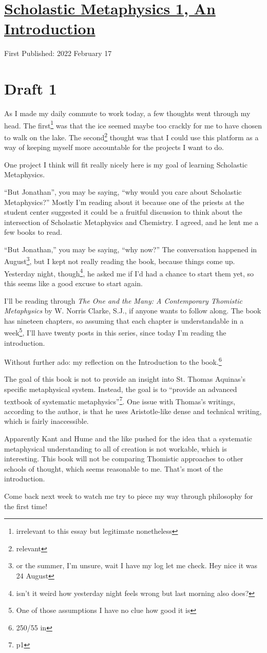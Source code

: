 \documentclass[12pt]{article}[titlepage]
\newcommand{\say}[1]{``#1''}
\newcommand{\1}{\={a}}
\newcommand{\2}{\={e}}
\newcommand{\3}{\={\i}}
\newcommand{\4}{\=o}
\newcommand{\5}{\=u}
\newcommand{\6}{\={A}}
\renewcommand{\,}{\textsuperscript{,}}
\begin{document}
\doublespacing
\section{\href{scholastic-metaphysics-1.html}{Scholastic Metaphysics 1, An Introduction}}
First Published: 2022 February 17

\section{Draft 1}
As I made my daily commute to work today, a few thoughts went through my head.
The first\footnote{irrelevant to this essay but legitimate nonetheless} was that the ice seemed maybe too crackly for me to have chosen to walk on the lake.
The second\footnote{relevant} thought was that I could use this platform as a way of keeping myself more accountable for the projects I want to do.

One project I think will fit really nicely here is my goal of learning Scholastic Metaphysics.

\say{But Jonathan}, you may be saying, \say{why would you care about Scholastic Metaphysics?}
Mostly I'm reading about it because one of the priests at the student center suggested it could be a fruitful discussion to think about the intersection of Scholastic Metaphysics and Chemistry.
I agreed, and he lent me a few books to read.

\say{But Jonathan,} you may be saying, \say{why now?}
The conversation happened in August\footnote{or the summer, I'm unsure, wait I have my log let me check. Hey nice it was 24 August}, but I kept not really reading the book, because things come up.
Yesterday night, though\footnote{isn't it weird how yesterday night feels wrong but last morning also does?}, he asked me if I'd had a chance to start them yet, so this seems like a good excuse to start again.

I'll be reading through \emph{The One and the Many: A Contemporary Thomistic Metaphysics} by W. Norris Clarke, S.J., if anyone wants to follow along.
The book has nineteen chapters, so assuming that each chapter is understandable in a week\footnote{One of those assumptions I have no clue how good it is}, I'll have twenty posts in this series, since today I'm reading the introduction.

Without further ado: my reflection on the Introduction to the book.\footnote{250/55 in}

The goal of this book is not to provide an insight into St. Thomas Aquinas's specific metaphysical system.
Instead, the goal is to \say{provide an advanced textbook of systematic metaphysics}\footnote{p1}.
One issue with Thomas's writings, according to the author, is that he uses Aristotle-like dense and technical writing, which is fairly inaccessible.

Apparently Kant and Hume and the like pushed for the idea that a systematic metaphysical understanding to all of creation is not workable, which is interesting.
This book will not be comparing Thomistic approaches to other schools of thought, which seems reasonable to me.
That's most of the introduction.

Come back next week to watch me try to piece my way through philosophy for the first time!
\end{document}
